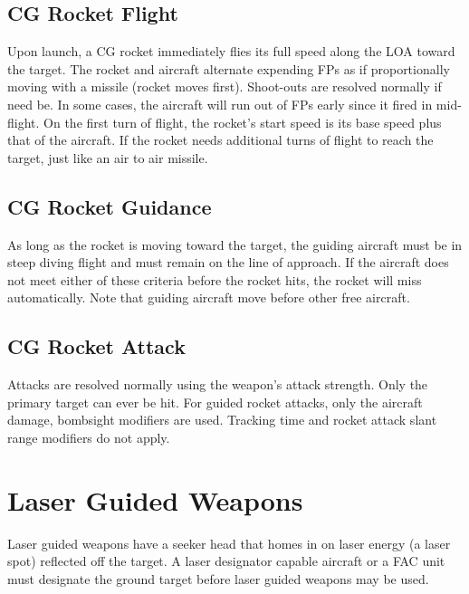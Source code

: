 \subsection{CG Rocket Flight} Upon launch, a CG rocket immediately flies its full speed along the LOA toward the target. The rocket and aircraft alternate expending FPs as if proportionally moving with a missile (rocket moves first). Shoot-outs are resolved normally if need be. In some cases, the aircraft will run out of FPs early since it fired in mid-flight. On the first turn of flight, the rocket's start speed is its base speed plus that of the aircraft. If the rocket needs additional turns of flight to reach the target,  just like an air to air missile.

\subsection{CG Rocket Guidance} As long as the rocket is moving toward the target, the guiding aircraft must be in steep diving flight and must remain on the line of approach. If the aircraft does not meet either of these criteria before the rocket hits, the rocket will miss automatically. Note that guiding aircraft move before other free aircraft.

\subsection{CG Rocket Attack} Attacks are resolved normally using the weapon's attack strength. Only the primary target can ever be hit.  For guided rocket attacks, only the aircraft damage, bombsight modifiers are used. Tracking time and rocket attack slant range modifiers do not apply.

\section{Laser Guided Weapons}
\label{rule:laser-guided-weapons}

Laser guided weapons have a seeker head that homes in on laser energy (a laser spot) reflected off the target. A laser designator capable aircraft or a FAC unit must designate the ground target before laser guided weapons may be used.

